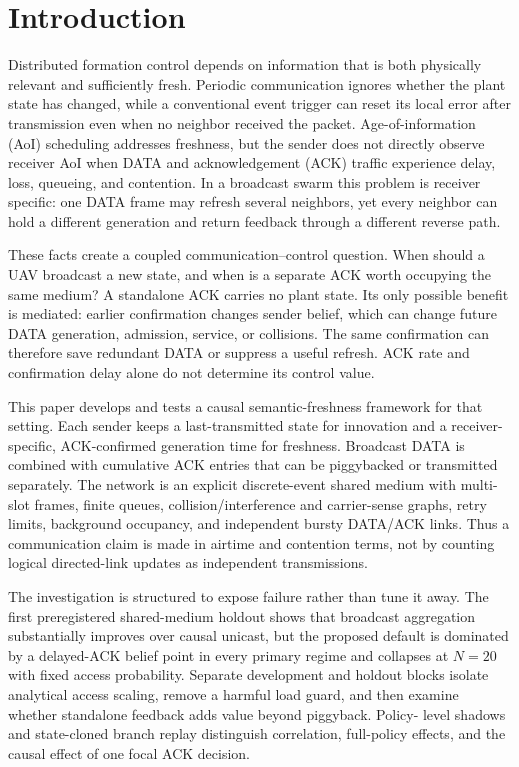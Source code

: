 \section{Introduction}
\label{sec:s2-introduction}

Distributed formation control depends on information that is both physically
relevant and sufficiently fresh. Periodic communication ignores whether the
plant state has changed, while a conventional event trigger can reset its
local error after transmission even when no neighbor received the packet.
Age-of-information (AoI) scheduling addresses freshness, but the sender does
not directly observe receiver AoI when DATA and acknowledgement (ACK) traffic
experience delay, loss, queueing, and contention. In a broadcast swarm this
problem is receiver specific: one DATA frame may refresh several neighbors,
yet every neighbor can hold a different generation and return feedback through
a different reverse path.

These facts create a coupled communication--control question. When should a
UAV broadcast a new state, and when is a separate ACK worth occupying the same
medium? A standalone ACK carries no plant state. Its only possible benefit is
mediated: earlier confirmation changes sender belief, which can change future
DATA generation, admission, service, or collisions. The same confirmation can
therefore save redundant DATA or suppress a useful refresh. ACK rate and
confirmation delay alone do not determine its control value.

This paper develops and tests a causal semantic-freshness framework for that
setting. Each sender keeps a last-transmitted state for innovation and a
receiver-specific, ACK-confirmed generation time for freshness. Broadcast DATA
is combined with cumulative ACK entries that can be piggybacked or transmitted
separately. The network is an explicit discrete-event shared medium with
multi-slot frames, finite queues, collision/interference and carrier-sense
graphs, retry limits, background occupancy, and independent bursty DATA/ACK
links. Thus a communication claim is made in airtime and contention terms,
not by counting logical directed-link updates as independent transmissions.

The investigation is structured to expose failure rather than tune it away.
The first preregistered shared-medium holdout shows that broadcast aggregation
substantially improves over causal unicast, but the proposed default is
dominated by a delayed-ACK belief point in every primary regime and collapses
at $N=20$ with fixed access probability. Separate development and holdout
blocks isolate analytical access scaling, remove a harmful load guard, and
then examine whether standalone feedback adds value beyond piggyback. Policy-
level shadows and state-cloned branch replay distinguish correlation,
full-policy effects, and the causal effect of one focal ACK decision.

